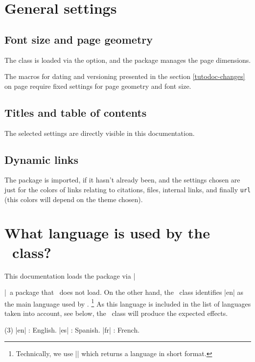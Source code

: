 \section{General settings}

\subsection{Font size and page geometry}

The  class is loaded via the  option, and the  package manages the page dimensions.


\begin{tdocwarn}
	The macros for dating and versioning presented in the section \ref{tutodoc-changes} on page \pageref{tutodoc-changes} require fixed settings for page geometry and font size.
\end{tdocwarn}


\subsection{Titles and table of contents}

The selected settings are directly visible in this documentation.


\subsection{Dynamic links}

The  package is imported, if it hasn't already been, and the settings chosen are just for the colors of links relating to citations, files, internal links, and finally \verb#url# (this colors will depend on the theme chosen).


\section{What language is used by the \thisproj\ class?}

This documentation loads the  package via \tdoclatexin|\usepackage[english]{babel}|\, a package that \thisproj\ does not load.
On the other hand, the \thisproj\ class identifies \tdoclatexin|en| as the main language used by .%
\footnote{
    Technically, we use \tdoclatexin|| which returns a language in short format.
}
As this language is included in the list of languages taken into account, see below, the \thisproj\ class will produce the expected effects.
\begin{tasks}[label=\small\textbullet](3)
    \task \tdoclatexin|en| : English.
        \task \tdoclatexin|es| : Spanish.
        \task \tdoclatexin|fr| : French.
\end{tasks}


